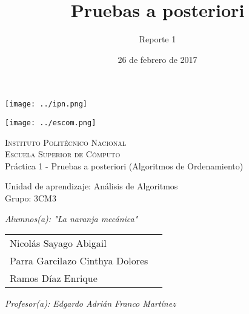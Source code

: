 \documentclass[12pt]{article}
\date{26 de febrero de 2017}
\title{Pruebas a posteriori}
\author{Reporte 1}
\begin{document}
		\begin{titlepage}
			\begin{center}
				
				
				\noindent
				\begin{minipage}{0.5\textwidth}
					\begin{flushleft} \large
						\texttt{[image: ../ipn.png]}
					\end{flushleft}
				\end{minipage}%
				\begin{minipage}{0.55\textwidth}
					\begin{flushright} \large
						\texttt{[image: ../escom.png]}
					\end{flushright}
				\end{minipage}
				
				\textsc{\LARGE Instituto Politécnico Nacional}\\[0.5cm]
				
				\textsc{\Large Escuela Superior de Cómputo}\\[1cm]
				
				
				{ \huge Práctica 1 - Pruebas a posteriori (Algoritmos de Ordenamiento)\\[1cm] }
				
				{ \Large Unidad de aprendizaje: Análisis de Algoritmos} \\[1cm]
				
				{ \Large Grupo: 3CM3} \\[1cm]
				
				\noindent
				\begin{minipage}{0.5\textwidth}
					\begin{flushleft} \large
						\emph{Alumnos(a): "La naranja mecánica"}\\
						
						\begin{tabular}{ll}
					     Nicolás Sayago Abigail\\
					     Parra Garcilazo Cinthya Dolores\\
					     Ramos Díaz Enrique \\
					
					\end{tabular}
					\end{flushleft}
				\end{minipage}%
				\begin{minipage}{0.5\textwidth}
					\begin{flushright} \large
						\emph{Profesor(a): Edgardo Adrián Franco Martínez} \\
						  \\
					\end{flushright}
				\end{minipage}
				

\end{center}
\end{titlepage}
\end{document}
